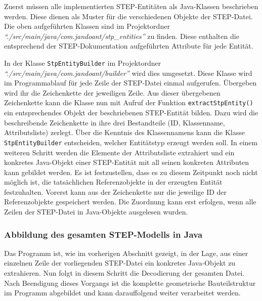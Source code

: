 Zuerst müssen alle implementierten STEP-Entitäten als Java-Klassen beschrieben werden. Diese dienen als Muster für die verschiedenen Objekte der STEP-Datei. Die oben aufgeführten Klassen sind im Projektordner \textit{"`./src/main/java/com.jandoant/stp\_entities"'} zu finden. Diese enthalten die entsprechend der STEP-Dokumentation aufgeführten Attribute für jede Entität. 

In der Klasse \verb|StpEntityBuilder| im Projektordner \textit{"`./src/main/java/com.jandoant/builder"'} wird dies umgesetzt. Diese Klasse wird im Programmablauf für jede Zeile der STEP-Datei einmal aufgerufen. Übergeben wird ihr die Zeichenkette der jeweiligen Zeile. Aus dieser übergebenen Zeichenkette kann die Klasse nun mit Aufruf der Funktion \verb|extractStpEntity()| ein entsprechendes Objekt der beschriebenen STEP-Entität bilden. 
Dazu wird die beschreibende Zeichenkette in ihre drei Bestandteile (ID, Klassenname, Attributsliste) zerlegt. Über die Kenntnis des Klassennamens kann die Klasse \verb|StpEntityBuilder| entscheiden, welcher Entitätstyp erzeugt werden soll. In einem weiteren Schritt werden die Elemente der Attributsliste extrahiert und ein konkretes Java-Objekt einer STEP-Entität mit all seinen konkreten Attributen kann gebildet werden. Es ist festzustellen, dass es zu diesem Zeitpunkt noch nicht möglich ist, die tatsächlichen Referenzobjekte in der erzeugten Entität festzuhalten. Vorerst kann aus der Zeichenkette nur die jeweilige ID der Referenzobjekte gespeichert werden. Die Zuordnung kann erst erfolgen, wenn alle Zeilen der STEP-Datei in Java-Objekte ausgelesen wurden.

\subsubsection{Abbildung des gesamten STEP-Modells in Java} 

Das Programm ist, wie im vorherigen Abschnitt gezeigt, in der Lage, aus einer einzelnen Zeile der vorliegenden STEP-Datei ein konkretes Java-Objekt zu extrahieren. Nun folgt in diesem Schritt die Decodierung der gesamten Datei. Nach Beendigung dieses Vorgangs ist die komplette geometrische Bauteilstruktur im Programm abgebildet und kann darauffolgend weiter verarbeitet werden.

